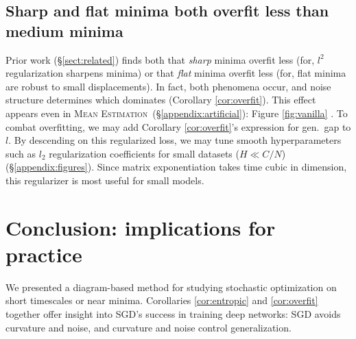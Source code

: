 \documentclass{article}
\newcommand{\ofsix}[1]{
    {\tiny \raisebox{0.04cm}{$\substack{
        \ifthenelse{\equal{#1}{0}}{{\color{moor}\blacksquare}}{\square}
        \ifthenelse{\equal{#1}{2}}{{\color{moor}\blacksquare}}{\square}    
        \ifthenelse{\equal{#1}{4}}{{\color{moor}\blacksquare}}{\square} \\
        \ifthenelse{\equal{#1}{1}}{{\color{moor}\blacksquare}}{\square}    
        \ifthenelse{\equal{#1}{3}}{{\color{moor}\blacksquare}}{\square}
        \ifthenelse{\equal{#1}{5}}{{\color{moor}\blacksquare}}{\square}
    }$}}%
}
\theoremstyle{plain}
\theoremstyle{definition}
\newcommand{\MeanEstimation}{\textsc{Mean Estimation}}
\begin{document}

    \subsection{Sharp and flat minima both overfit less than medium minima} \label{subsect:overfit}

        Prior work (\S\ref{sect:related}) finds both that \emph{sharp} minima
        overfit less (for, $l^2$ regularization sharpens minima) or that
        \emph{flat} minima overfit less (for, flat minima are robust to small
        displacements).  In fact, both phenomena occur, and noise structure
        determines which dominates (Corollary \ref{cor:overfit}).  This effect
        appears even in \MeanEstimation\, (\S\ref{appendix:artificial}): Figure
        \ref{fig:vanilla}\ofsix{5}.
        To combat overfitting, we may add Corollary \ref{cor:overfit}'s
        expression for gen.\ gap to $l$.  By descending on this regularized
        loss, we may tune smooth hyperparameters such as $l_2$ regularization
        coefficients for small datasets ($H \ll C/N$)
        (\S\ref{appendix:figures}).  Since matrix exponentiation takes time
        cubic in dimension, this regularizer is most useful for small models.


\section{Conclusion: implications for practice} \label{sect:concl}


    We presented a diagram-based method for studying stochastic optimization on
    short timescales or near minima.
        Corollaries \ref{cor:entropic} and \ref{cor:overfit} together offer
        insight into SGD's success in training deep networks: SGD avoids
        curvature and noise, and curvature and noise control generalization.
\end{document}
